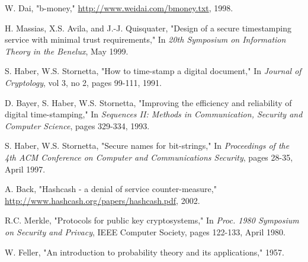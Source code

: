 \documentclass{article}
\begin{document}
\begin{thebibliography}{99}
 
 W. Dai, "b-money," \url{http://www.weidai.com/bmoney.txt}, 1998.
 
 H. Massias, X.S. Avila, and J.-J. Quisquater, "Design of a secure timestamping service with minimal trust requirements," In \textit{20th Symposium on Information Theory in the Benelux}, May 1999.
 
 S. Haber, W.S. Stornetta, "How to time-stamp a digital document," In \textit{Journal of Cryptology}, vol 3, no 2, pages 99-111, 1991.
 
 D. Bayer, S. Haber, W.S. Stornetta, "Improving the efficiency and reliability of digital time-stamping," In \textit{Sequences II: Methods in Communication, Security and Computer Science}, pages 329-334, 1993.
 
 S. Haber, W.S. Stornetta, "Secure names for bit-strings," In \textit{Proceedings of the 4th ACM Conference on Computer and Communications Security}, pages 28-35, April 1997.
 
 A. Back, "Hashcash - a denial of service counter-measure," \url{http://www.hashcash.org/papers/hashcash.pdf}, 2002.
 
 R.C. Merkle, "Protocols for public key cryptosystems," In \textit{Proc. 1980 Symposium on Security and Privacy}, IEEE Computer Society, pages 122-133, April 1980.
 
 W. Feller, "An introduction to probability theory and its applications," 1957.
 
\end{thebibliography}
\end{document}
